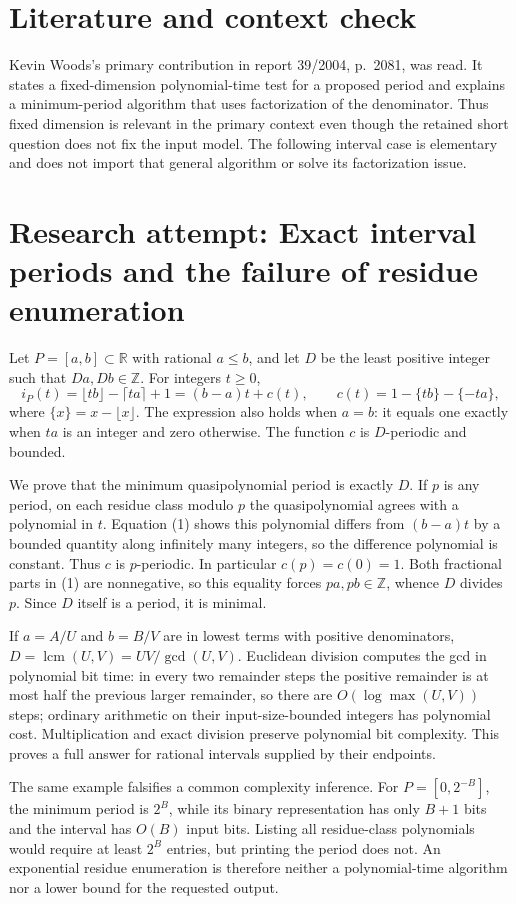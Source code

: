 \documentclass[11pt]{article}
\begin{document}
\section{Literature and context check}
Kevin Woods's primary contribution in report 39/2004, p.~2081, was read. It states a fixed-dimension polynomial-time test for a proposed period and explains a minimum-period algorithm that uses factorization of the denominator. Thus fixed dimension is relevant in the primary context even though the retained short question does not fix the input model. The following interval case is elementary and does not import that general algorithm or solve its factorization issue.
\section{Research attempt: Exact interval periods and the failure of residue enumeration}
Let $P=[a,b]\subset\mathbb R$ with rational $a\leq b$, and let $D$ be the least positive integer such that $Da,Db\in\mathbb Z$. For integers $t\geq0$,
\[
 i_P(t)=\lfloor tb\rfloor-\lceil ta\rceil+1
       =(b-a)t+c(t),\qquad
 c(t)=1-\{tb\}-\{-ta\},                         \tag{1}
\]
where $\{x\}=x-\lfloor x\rfloor$. The expression also holds when $a=b$: it equals one exactly when $ta$ is an integer and zero otherwise. The function $c$ is $D$-periodic and bounded.

We prove that the minimum quasipolynomial period is exactly $D$. If $p$ is any period, on each residue class modulo $p$ the quasipolynomial agrees with a polynomial in $t$. Equation (1) shows this polynomial differs from $(b-a)t$ by a bounded quantity along infinitely many integers, so the difference polynomial is constant. Thus $c$ is $p$-periodic. In particular $c(p)=c(0)=1$. Both fractional parts in (1) are nonnegative, so this equality forces $pa,pb\in\mathbb Z$, whence $D$ divides $p$. Since $D$ itself is a period, it is minimal.

If $a=A/U$ and $b=B/V$ are in lowest terms with positive denominators, $D=\operatorname{lcm}(U,V)=UV/\gcd(U,V)$. Euclidean division computes the gcd in polynomial bit time: in every two remainder steps the positive remainder is at most half the previous larger remainder, so there are $O(\log\max(U,V))$ steps; ordinary arithmetic on their input-size-bounded integers has polynomial cost. Multiplication and exact division preserve polynomial bit complexity. This proves a full answer for rational intervals supplied by their endpoints.

The same example falsifies a common complexity inference. For $P=[0,2^{-B}]$, the minimum period is $2^B$, while its binary representation has only $B+1$ bits and the interval has $O(B)$ input bits. Listing all residue-class polynomials would require at least $2^B$ entries, but printing the period does not. An exponential residue enumeration is therefore neither a polynomial-time algorithm nor a lower bound for the requested output.
\end{document}
